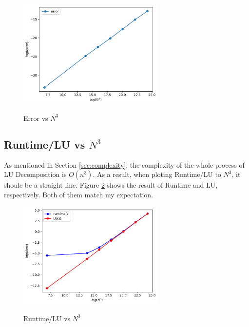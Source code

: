 \documentclass{article}
\begin{document}
\begin{figure}[H]
    \centering
    \caption{Error vs $N^3$}
    \includegraphics[width=0.65\textwidth]{src/error.pdf}
    \label{fig:error}
\end{figure}

\subsection{Runtime/LU vs $N^3$}
As mentioned in Section \ref{sec:complexity}, the complexity of the whole process of LU Decomposition is $O(n^3)$. As a result,
when ploting Runtime/LU to $N^3$, it shoule be a straight line. Figure \ref{fig:runtime/LU} shows the result of
Runtime and LU, respectively. Both of them match my expectation.

\begin{figure}[H]
    \centering
    \caption{Runtime/LU vs $N^3$}
    \includegraphics[width=0.65\textwidth]{src/time.pdf}
    \label{fig:runtime/LU}
\end{figure}
\end{document}
